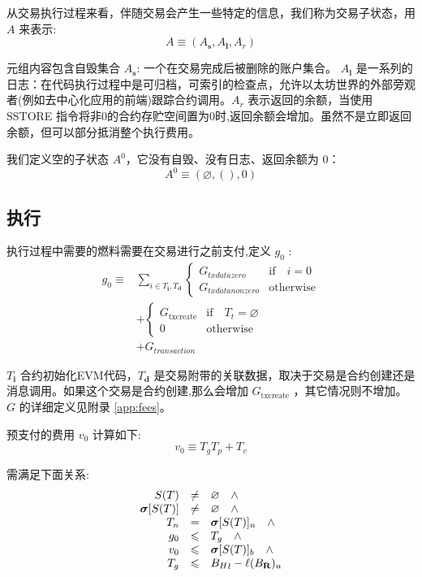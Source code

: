 \documentclass[9pt,oneside]{amsart}
\begin{document}
\begin{multicols}{2}
从交易执行过程来看，伴随交易会产生一些特定的信息，我们称为交易子状态，用 $A$ 来表示:
\begin{equation}
A \equiv (A_\mathbf{s}, A_\mathbf{l}, A_r)
\end{equation}

元组内容包含自毁集合 $A_\mathbf{s}$: 一个在交易完成后被删除的账户集合。 $A_\mathbf{l}$ 是一系列的日志：在代码执行过程中是可归档，可索引的检查点，允许以太坊世界的外部旁观者(例如去中心化应用的前端)跟踪合约调用。$A_r$ 表示返回的余额，当使用 {\small SSTORE} 指令将非0的合约存贮空间置为0时,返回余额会增加。虽然不是立即返回余额，但可以部分抵消整个执行费用。

我们定义空的子状态 $A^0$，它没有自毁、没有日志、返回余额为 0：
\begin{equation}
A^0 \equiv (\varnothing, (), 0)
\end{equation}

\subsection{执行}

执行过程中需要的燃料需要在交易进行之前支付,定义 $g_0$ :
\begin{align}
g_0 \equiv {} & \sum_{i \in T_\mathbf{i}, T_\mathbf{d}} \begin{cases} G_{txdatazero} & \text{if} \quad i = 0 \\ G_{txdatanonzero} & \text{otherwise} \end{cases} \\
{} & + \begin{cases} G_\text{txcreate} & \text{if} \quad T_t = \varnothing \\ 0 & \text{otherwise} \end{cases} \\
{} & + G_{transaction}
\end{align}

$T_\mathbf{i}$ 合约初始化EVM代码，$T_\mathbf{d}$ 是交易附带的关联数据，取决于交易是合约创建还是消息调用。如果这个交易是合约创建,那么会增加 $G_\text{txcreate}$ ，其它情况则不增加。$G$ 的详细定义见附录 \ref{app:fees}。

预支付的费用 $v_0$ 计算如下:
\begin{equation}
v_0 \equiv T_g T_p + T_v
\end{equation}

需满足下面关系:
\begin{equation}
\begin{array}[t]{rcl}
S(T) & \neq & \varnothing \quad \wedge \\
\boldsymbol{\sigma}[S(T)] & \neq & \varnothing \quad \wedge \\
T_n & = & \boldsymbol{\sigma}[S(T)]_n \quad \wedge \\
g_0 & \leqslant & T_g \quad \wedge \\
v_0 & \leqslant & \boldsymbol{\sigma}[S(T)]_b \quad \wedge \\
T_g & \leqslant & {B_H}_l - \ell(B_\mathbf{R})_u
\end{array}
\end{equation}



\end{multicols}
\end{document}
